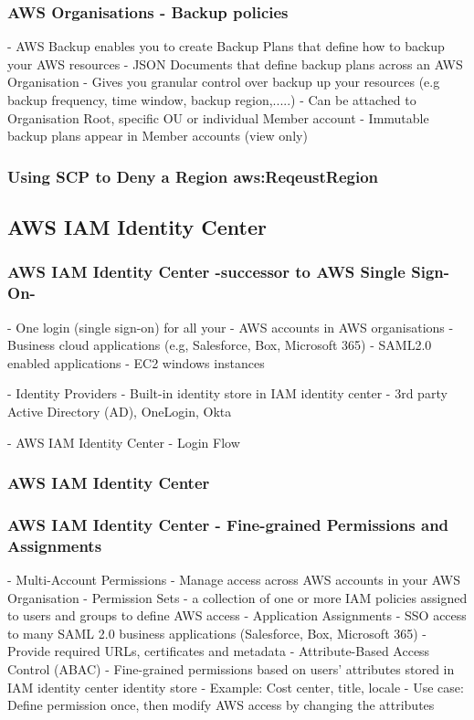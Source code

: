 \documentclass[11pt]{book}
\begin{document}
    \subsubsection{AWS Organisations - Backup policies}
    - AWS Backup enables you to create Backup Plans that define how to backup your AWS resources
    - JSON Documents that define backup plans across an AWS Organisation
    - Gives you granular control over backup up your resources (e.g backup frequency, time window, backup region,.....)
    - Can be attached to Organisation Root, specific OU or individual Member account
    - Immutable backup plans appear in Member accounts (view only)

    \subsubsection{Using SCP to Deny a Region aws:ReqeustRegion}

    \subsection{AWS IAM Identity Center}

    \subsubsection{AWS IAM Identity Center -successor to AWS Single Sign-On- }
    - One login (single sign-on) for all your
    - AWS accounts in AWS organisations
    - Business cloud applications (e.g, Salesforce, Box, Microsoft 365)
    - SAML2.0 enabled applications
    - EC2 windows instances

    - Identity Providers
    - Built-in identity store in IAM identity center
    - 3rd party Active Directory (AD), OneLogin, Okta

    - AWS IAM Identity Center - Login Flow

    \subsubsection{AWS IAM Identity Center}

    \subsubsection{AWS IAM Identity Center - Fine-grained Permissions and Assignments}
    - Multi-Account Permissions
    - Manage access across AWS accounts in your AWS Organisation
    - Permission Sets - a collection of one or more IAM policies assigned to users and groups to define AWS access
    - Application Assignments
    - SSO access to many SAML 2.0 business applications (Salesforce, Box, Microsoft 365)
    - Provide required URLs, certificates and metadata
    - Attribute-Based Access Control (ABAC)
    - Fine-grained permissions based on users' attributes stored in IAM identity center identity store
    - Example: Cost center, title, locale
    - Use case: Define permission once, then modify AWS access by changing the attributes
\end{document}
